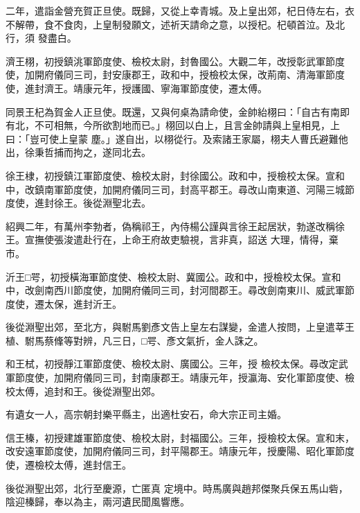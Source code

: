 \begin{pinyinscope}
 二年，遣詣金營充賀正旦使。既歸，又從上幸青城。及上皇出郊，杞日侍左右，衣不解帶，食不食肉，上皇制發願文，述祈天請命之意，以授杞。杞頓首泣。及北行，須
 發盡白。



 濟王栩，初授鎮洮軍節度使、檢校太尉，封魯國公。大觀二年，改授彰武軍節度使，加開府儀同三司，封安康郡王，政和中，授檢校太保，改荊南、清海軍節度使，進封濟王。靖康元年，授護國、寧海軍節度使，遷太傅。



 同景王杞為賀金人正旦使。既還，又與何桌為請命使，金帥紿栩曰：「自古有南即有北，不可相無，今所欲割地而已。」栩回以白上，且言金帥請與上皇相見，上曰：「豈可使上皇蒙
 塵。」遂自出，以栩從行。及索諸王家屬，栩夫人曹氏避難他出，徐秉哲捕而拘之，遂同北去。



 徐王棣，初授鎮江軍節度使、檢校太尉，封徐國公。政和中，授檢校太保。宣和中，改鎮南軍節度使，加開府儀同三司，封高平郡王。尋改山南東道、河陽三城節度使，進封徐王。後從淵聖北去。



 紹興二年，有萬州李勃者，偽稱祁王，內侍楊公謹與言徐王起居狀，勃遂改稱徐王。宣撫使張浚遣赴行在，上命王府故吏驗視，言非真，詔送
 大理，情得，棄市。



 沂王□咢，初授橫海軍節度使、檢校太尉、冀國公。政和中，授檢校太保。宣和中，改劍南西川節度使，加開府儀同三司，封河間郡王。尋改劍南東川、威武軍節度使，遷太保，進封沂王。



 後從淵聖出郊，至北方，與駙馬劉彥文告上皇左右謀變，金遣人按問，上皇遣莘王植、駙馬蔡鞗等對辨，凡三日，□咢、彥文氣折，金人誅之。



 和王栻，初授靜江軍節度使、檢校太尉、廣國公。三年，授
 檢校太保。尋改定武軍節度使，加開府儀同三司，封南康郡王。靖康元年，授瀛海、安化軍節度使、檢校太傅，追封和王。後從淵聖出郊。



 有遺女一人，高宗朝封樂平縣主，出適杜安石，命大宗正司主婚。



 信王榛，初授建雄軍節度使、檢校太尉，封福國公。三年，授檢校太保。宣和末，改安遠軍節度使，加開府儀同三司，封平陽郡王。靖康元年，授慶陽、昭化軍節度使，遷檢校太傅，進封信王。



 後從淵聖出郊，北行至慶源，亡匿真
 定境中。時馬廣與趙邦傑聚兵保五馬山砦，陰迎榛歸，奉以為主，兩河遺民聞風響應。




\end{pinyinscope}
